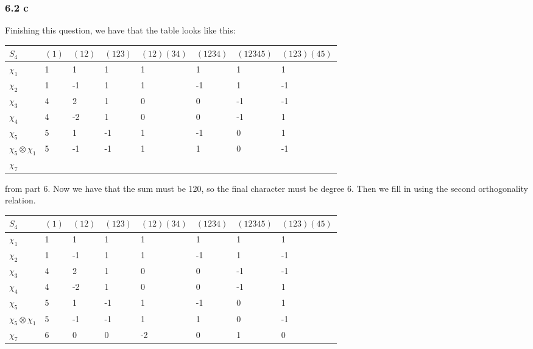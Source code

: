 \documentclass[]{article}
\begin{document}
\subsubsection*{6.2 c}
Finishing this question, we have that the table looks like this:
\begin{table}[H]
	\centering
	\begin{tabular}{|l|l|l|l|l|l|l|l|}
		\hline
		$S_4$                   & $(1)$ & $(12)$ & $(123)$ & $(12)(34)$ & $(1234)$ & $(12345)$ & $(123)(45)$ \\ \hline
		$\chi_1$                & 1     & 1      & 1       & 1          & 1        & 1         & 1           \\ \hline
		$\chi_2$                & 1     & -1     & 1       & 1          & -1       & 1         & -1          \\ \hline
		$\chi_3$                & 4     & 2      & 1       & 0          & 0        & -1        & -1          \\ \hline
		$\chi_4$                & 4     & -2     & 1       & 0          & 0        & -1        & 1           \\ \hline
		$\chi_5$                & 5     & 1      & -1      & 1          & -1       & 0         & 1           \\ \hline
		$\chi_5 \otimes \chi_1$ & 5     & -1     & -1      & 1          & 1        & 0         & -1          \\ \hline
		$\chi_7$                &       &        &         &            &          &           &             \\ \hline
	\end{tabular}
\end{table}
from part 6. Now we have that the sum must be 120, so the final character must be degree 6. Then we fill in using the second orthogonality relation.
\begin{table}[H]
	\centering
	\begin{tabular}{|l|l|l|l|l|l|l|l|}
		\hline
		$S_4$                   & $(1)$ & $(12)$ & $(123)$ & $(12)(34)$ & $(1234)$ & $(12345)$ & $(123)(45)$ \\ \hline
		$\chi_1$                & 1     & 1      & 1       & 1          & 1        & 1         & 1           \\ \hline
		$\chi_2$                & 1     & -1     & 1       & 1          & -1       & 1         & -1          \\ \hline
		$\chi_3$                & 4     & 2      & 1       & 0          & 0        & -1        & -1          \\ \hline
		$\chi_4$                & 4     & -2     & 1       & 0          & 0        & -1        & 1           \\ \hline
		$\chi_5$                & 5     & 1      & -1      & 1          & -1       & 0         & 1           \\ \hline
		$\chi_5 \otimes \chi_1$ & 5     & -1     & -1      & 1          & 1        & 0         & -1          \\ \hline
		$\chi_7$                & 6     & 0      & 0       & -2         & 0        & 1         & 0           \\ \hline
	\end{tabular}
\end{table}
\end{document}
